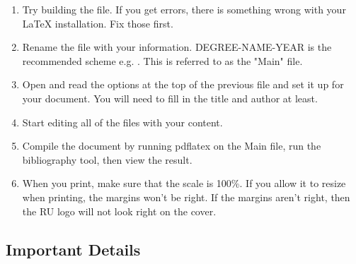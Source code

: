 \begin{enumerate}
 \item Try building the  file.  If you get errors, there
   is something wrong with your LaTeX installation.  Fix those first.

   
 \item Rename the  file with your information.
   DEGREE-NAME-YEAR is the recommended scheme 
   e.g. .
   This is referred to as the "Main" file.

 \item Open and read the options at the top of the previous file and set
   it up for your document.  You will need to fill in the title and
   author at least.

 \item Start editing all of the  files with your content.

 \item Compile the document by running pdflatex on the Main file, run the bibliography tool, then view the result.

 \item When you print, make sure that the scale is 100\%.
   If you allow it to resize when printing, the margins won't be right.
   If the  margins aren't right, then the RU logo will not look right on the
   cover.

\end{enumerate}

\subsection{Important Details}

